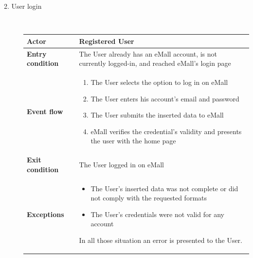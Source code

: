 \documentclass[11pt]{article}
\begin{document}
\begin{description}
    \item [2. User login] \hfill \\
    \begin{table}[H]
        \centering
        \setlength{\tabcolsep}{18pt}
        \renewcommand{\arraystretch}{1.4}
        \begin{tabularx}{\textwidth}{|>{\hsize=0.5\hsize}X|>{\hsize=1.5\hsize}X|}
            \hline
            \textbf{Actor} & Registered User \\
            \hline
            \textbf{Entry condition} & The User already has an eMall account, is not currently logged-in, and reached eMall's login page \\
            \hline
            \textbf{Event flow} & 
                \begin{minipage}[t]{\hsize}
                \begin{enumerate}[topsep=0pt, leftmargin=*]
                    \item The User selects the option to log in on eMall
                    \item The User enters his account's email and password
                    \item The User submits the inserted data to eMall
                    \item eMall verifies the credential's validity and presents the user with the home page
                \end{enumerate}
                \end{minipage}
                \vspace{6pt}
            \\
            \hline
            \textbf{Exit condition} & The User logged in on eMall \\
            \hline
            \textbf{Exceptions} & 
                \begin{minipage}[t]{\hsize}
                \vspace{0pt}
                \begin{itemize}[topsep=0pt, leftmargin=*]
                    \item The User's inserted data was not complete or did not comply with the requested formats
                    \item The User's credentials were not valid for any account
                \end{itemize}
                \vspace{8pt}
                \end{minipage}
                In all those situation an error is presented to the User.
                \vspace{6pt}
            \\
            \hline
        \end{tabularx}
    \end{table}
    

\end{description}
\end{document}
